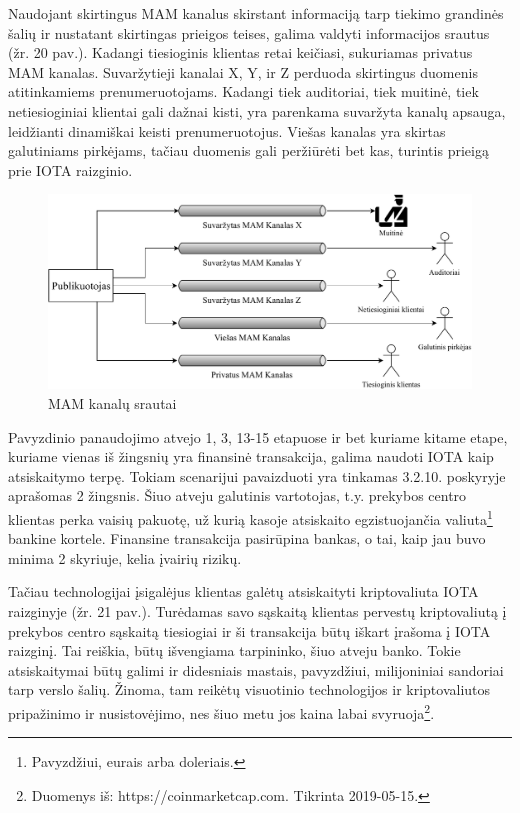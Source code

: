 Naudojant skirtingus MAM kanalus skirstant informaciją tarp tiekimo grandinės šalių ir nustatant skirtingas prieigos teises, galima valdyti informacijos srautus (žr. 20 pav.). Kadangi tiesioginis klientas retai keičiasi, sukuriamas privatus MAM kanalas. Suvaržytieji kanalai X, Y, ir Z perduoda skirtingus duomenis atitinkamiems prenumeruotojams. Kadangi tiek auditoriai, tiek muitinė, tiek netiesioginiai klientai gali dažnai kisti, yra parenkama suvaržyta kanalų apsauga, leidžianti dinamiškai keisti prenumeruotojus. Viešas kanalas yra skirtas galutiniams pirkėjams, tačiau duomenis gali peržiūrėti bet kas, turintis prieigą prie IOTA raizginio.

\begin{figure}[H]
    \centering
    \includegraphics[scale=0.8]{images/mam-channel-flows}
    \caption{MAM kanalų srautai}
\end{figure}

Pavyzdinio panaudojimo atvejo 1, 3, 13-15 etapuose ir bet kuriame kitame etape, kuriame vienas iš žingsnių yra finansinė transakcija, galima naudoti IOTA kaip atsiskaitymo terpę. Tokiam scenarijui pavaizduoti yra tinkamas 3.2.10. poskyryje aprašomas 2 žingsnis. Šiuo atveju galutinis vartotojas, t.y. prekybos centro klientas perka vaisių pakuotę, už kurią kasoje atsiskaito egzistuojančia valiuta\footnote{Pavyzdžiui, eurais arba doleriais.} bankine kortele. Finansine transakcija pasirūpina bankas, o tai, kaip jau buvo minima 2 skyriuje, kelia įvairių rizikų.

Tačiau technologijai įsigalėjus klientas galėtų atsiskaityti kriptovaliuta IOTA raizginyje (žr. 21 pav.). Turėdamas savo sąskaitą klientas pervestų kriptovaliutą į prekybos centro sąskaitą tiesiogiai ir ši transakcija būtų iškart įrašoma į IOTA raizginį. Tai reiškia, būtų išvengiama tarpininko, šiuo atveju banko. Tokie atsiskaitymai būtų galimi ir didesniais mastais, pavyzdžiui, milijoniniai sandoriai tarp verslo šalių. Žinoma, tam reikėtų visuotinio technologijos ir kriptovaliutos pripažinimo ir nusistovėjimo, nes šiuo metu jos kaina labai svyruoja\footnote{Duomenys iš: https://coinmarketcap.com. Tikrinta 2019-05-15.}.

